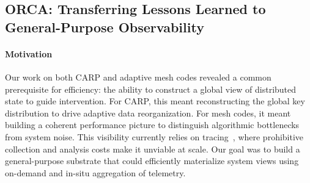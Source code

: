 \subsection{ORCA: Transferring Lessons Learned to General-Purpose Observability}

\paragraph{Motivation}

Our work on both CARP and adaptive mesh codes revealed a common prerequisite for efficiency: the
ability to construct a global view of distributed state to guide intervention.
For CARP, this meant reconstructing the global key distribution to drive adaptive data
reorganization.
For mesh codes, it meant building a coherent performance picture to distinguish algorithmic
bottlenecks from system noise.
This visibility currently relies on tracing~\cite{Wylie2025:15Years,2025:kineto}, where prohibitive
collection and analysis costs make it unviable at scale.
Our goal was to build a general-purpose substrate that could efficiently materialize system views
using on-demand and in-situ aggregation of telemetry.

